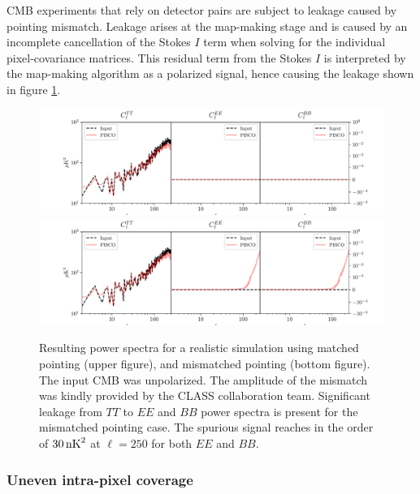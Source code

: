 \documentclass[a4paper,11pt]{article}
\begin{document}
CMB experiments that rely on detector pairs are subject to leakage caused by pointing mismatch. Leakage arises at the map-making stage and is caused by an incomplete cancellation of the Stokes $I$ term when solving for the individual pixel-covariance matrices. This residual term from the Stokes $I$ is interpreted by the map-making algorithm as a polarized signal, hence causing the leakage shown in figure \ref{fig::pisco4class_pointingmismatch}. %

\begin{figure}
	\centering
	\includegraphics[width=1\textwidth]{figures/unpolCMB_r0d00_CLASS_matchedPointing_matchedBeams_ellipticalBeams.pdf}
	\includegraphics[width=1\textwidth]{figures/unpolCMB_r0d00_CLASS_mismatchedPointing_matchedBeams_ellipticalBeams.pdf}
	\caption{Resulting power spectra for a realistic simulation using matched pointing (upper figure), and mismatched pointing (bottom figure). The input CMB was unpolarized. The amplitude of the mismatch was kindly provided by the CLASS collaboration team. Significant leakage from $TT$ to $EE$ and $BB$ power spectra is present for the mismatched pointing case. The spurious signal reaches in the order of $30\, \rm{nK}^2$ at $\ell = 250$ for both $EE$ and $BB$.}
	\label{fig::pisco4class_pointingmismatch}
\end{figure}

\subsubsection{Uneven intra-pixel coverage}
\end{document}
